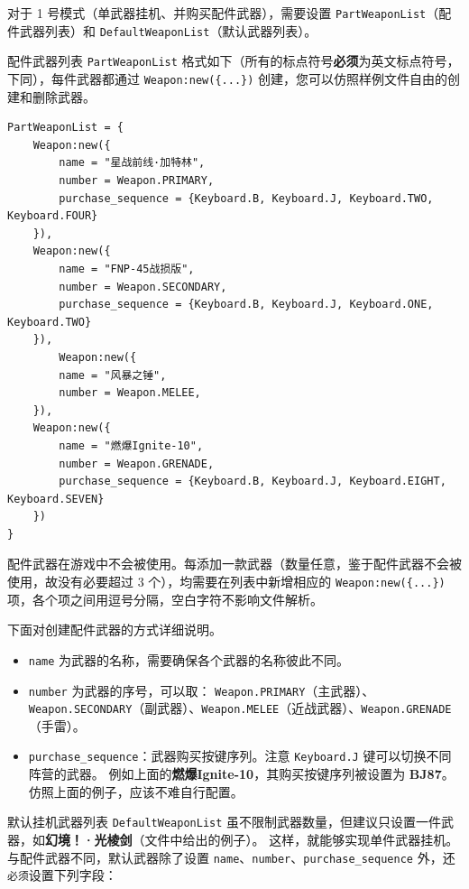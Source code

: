 对于 1 号模式（单武器挂机、并购买配件武器），需要设置 \lstinline{PartWeaponList}（配件武器列表）和 \lstinline{DefaultWeaponList}（默认武器列表）。

配件武器列表 \lstinline{PartWeaponList} 格式如下（所有的标点符号\textbf{必须}为英文标点符号，下同），每件武器都通过 \lstinline|Weapon:new({...})| 创建，您可以仿照样例文件自由的创建和删除武器。

\begin{verbatim}
PartWeaponList = {
    Weapon:new({
        name = "星战前线·加特林",
        number = Weapon.PRIMARY,
        purchase_sequence = {Keyboard.B, Keyboard.J, Keyboard.TWO, Keyboard.FOUR}
    }),
    Weapon:new({
        name = "FNP-45战损版",
        number = Weapon.SECONDARY,
        purchase_sequence = {Keyboard.B, Keyboard.J, Keyboard.ONE, Keyboard.TWO}
    }),
        Weapon:new({
        name = "风暴之锤",
        number = Weapon.MELEE,
    }),
    Weapon:new({
        name = "燃爆Ignite-10",
        number = Weapon.GRENADE,
        purchase_sequence = {Keyboard.B, Keyboard.J, Keyboard.EIGHT, Keyboard.SEVEN}
    })
}
\end{verbatim}

配件武器在游戏中不会被使用。每添加一款武器（数量任意，鉴于配件武器不会被使用，故没有必要超过 3 个），均需要在列表中新增相应的 \lstinline|Weapon:new({...})| 项，各个项之间用逗号分隔，空白字符不影响文件解析。

下面对创建配件武器的方式详细说明。

\begin{itemize}
\item \lstinline{name} 为武器的名称，需要确保各个武器的名称彼此不同。
\item \lstinline{number} 为武器的序号，可以取：
\lstinline{Weapon.PRIMARY}（主武器）、\lstinline{Weapon.SECONDARY}（副武器）、\lstinline{Weapon.MELEE}（近战武器）、\lstinline{Weapon.GRENADE}（手雷）。
\item \lstinline{purchase_sequence}：武器购买按键序列。注意 \lstinline{Keyboard.J} 键可以切换不同阵营的武器。
例如上面的\textbf{燃爆Ignite-10}，其购买按键序列被设置为 \textbf{BJ87}。仿照上面的例子，应该不难自行配置。
\end{itemize}

默认挂机武器列表 \lstinline{DefaultWeaponList} 虽不限制武器数量，但建议只设置一件武器，如\textbf{幻境！·光棱剑}（文件中给出的例子）。
这样，就能够实现单件武器挂机。
与配件武器不同，默认武器除了设置 \lstinline{name}、\lstinline{number}、\lstinline{purchase_sequence} 外，还\lstinline{必须}设置下列字段：

